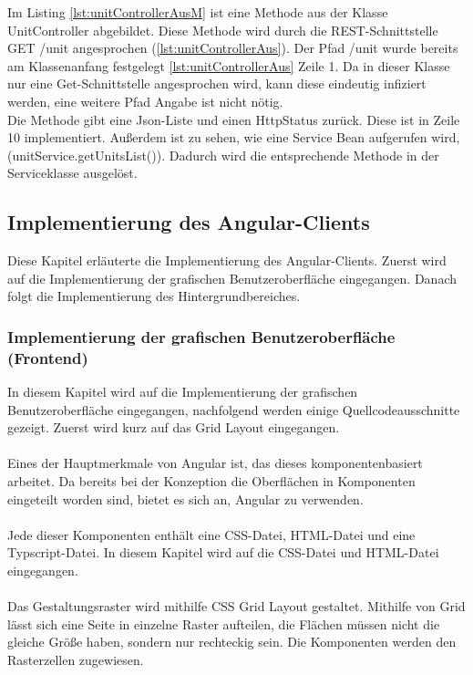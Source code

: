 Im Listing \ref{lst:unitControllerAusM} ist eine Methode aus der Klasse UnitController abgebildet. Diese Methode wird durch die REST-Schnittstelle GET /unit angesprochen (\ref{lst:unitControllerAus}). Der Pfad /unit wurde bereits am Klassenanfang festgelegt \ref{lst:unitControllerAus} Zeile 1. Da in dieser Klasse nur eine Get-Schnittstelle angesprochen wird, kann diese eindeutig infiziert werden, eine weitere Pfad Angabe ist nicht nötig. 
\\
Die Methode gibt eine Json-Liste und einen HttpStatus zurück. Diese ist in Zeile 10 implementiert. Außerdem ist zu sehen, wie eine Service Bean aufgerufen wird, (unitService.getUnitsList()). Dadurch wird die entsprechende Methode in der Serviceklasse ausgelöst.














\subsection{Implementierung des Angular-Clients}

Diese Kapitel erläuterte die Implementierung des Angular-Clients. Zuerst wird auf die Implementierung der grafischen Benutzeroberfläche eingegangen. Danach folgt die Implementierung des Hintergrundbereiches.


\subsubsection{Implementierung der grafischen Benutzeroberfläche (Frontend)}

In diesem Kapitel wird auf die Implementierung der grafischen Benutzeroberfläche eingegangen, nachfolgend werden einige Quellcodeausschnitte gezeigt. Zuerst wird kurz auf das Grid Layout eingegangen.
\\
\\
\newpage
Eines der Hauptmerkmale von Angular ist, das dieses komponentenbasiert arbeitet. 
Da bereits bei der Konzeption die Oberflächen in Komponenten eingeteilt worden sind, bietet es sich an, Angular zu verwenden.
\\
\\
Jede dieser Komponenten enthält eine CSS-Datei, HTML-Datei und eine Typscript-Datei. In diesem Kapitel wird auf die CSS-Datei und HTML-Datei eingegangen.
\\
\\
Das Gestaltungsraster wird mithilfe CSS Grid Layout gestaltet. Mithilfe von Grid lässt sich eine Seite in einzelne Raster aufteilen, die Flächen müssen nicht die gleiche Größe haben, sondern nur rechteckig sein. 
Die Komponenten werden den Rasterzellen zugewiesen.

